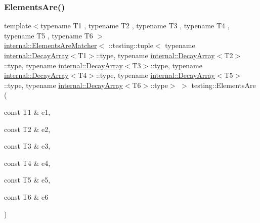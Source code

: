 \subsubsection{\texorpdfstring{Elements\+Are()}{ElementsAre()}\hspace{0.1cm}{\footnotesize\ttfamily [7/11]}}
{\footnotesize\ttfamily template$<$typename T1 , typename T2 , typename T3 , typename T4 , typename T5 , typename T6 $>$ \\
\hyperlink{classtesting_1_1internal_1_1_elements_are_matcher}{internal\+::\+Elements\+Are\+Matcher}$<$ \+::testing\+::tuple$<$ typename \hyperlink{structtesting_1_1internal_1_1_decay_array}{internal\+::\+Decay\+Array}$<$T1$>$\+::type, typename \hyperlink{structtesting_1_1internal_1_1_decay_array}{internal\+::\+Decay\+Array}$<$T2$>$\+::type, typename \hyperlink{structtesting_1_1internal_1_1_decay_array}{internal\+::\+Decay\+Array}$<$T3$>$\+::type, typename \hyperlink{structtesting_1_1internal_1_1_decay_array}{internal\+::\+Decay\+Array}$<$T4$>$\+::type, typename \hyperlink{structtesting_1_1internal_1_1_decay_array}{internal\+::\+Decay\+Array}$<$T5$>$\+::type, typename \hyperlink{structtesting_1_1internal_1_1_decay_array}{internal\+::\+Decay\+Array}$<$T6$>$\+::type$>$ $>$ testing\+::\+Elements\+Are (\begin{DoxyParamCaption}\item[{const T1 \&}]{e1,  }\item[{const T2 \&}]{e2,  }\item[{const T3 \&}]{e3,  }\item[{const T4 \&}]{e4,  }\item[{const T5 \&}]{e5,  }\item[{const T6 \&}]{e6 }\end{DoxyParamCaption})\hspace{0.3cm}{\ttfamily [inline]}}

\mbox{\label{namespacetesting_a3af9f549d951a4961825f821e6d47da9}} 
